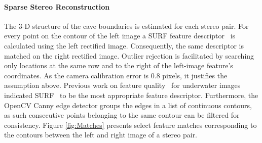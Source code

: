 \paragraph*{Sparse Stereo Reconstruction} The 3\hyp D structure of the cave boundaries is estimated for each stereo pair. For every point on the contour of the left image a SURF feature descriptor~\cite{Surf} is calculated using the left rectified image. Consequently, the same descriptor is matched on the right rectified image. Outlier rejection is facilitated by searching only locations at the same row and to the right of the left\hyp image feature's coordinates. As the camera calibration error is 0.8 pixels, it justifies the assumption above. Previous work on feature quality~\cite{ShiTomasi,Shkurti2011,RekleitisOceans2016} for underwater images indicated SURF~\cite{Surf} to be the most appropriate feature descriptor. Furthermore, the OpenCV Canny edge detector groups the edges in a list of continuous contours, as such consecutive points belonging to the same contour can be filtered for consistency.  Figure \ref{fig:Matches} presents select feature matches corresponding to the contours between the left and right image of a stereo pair.


